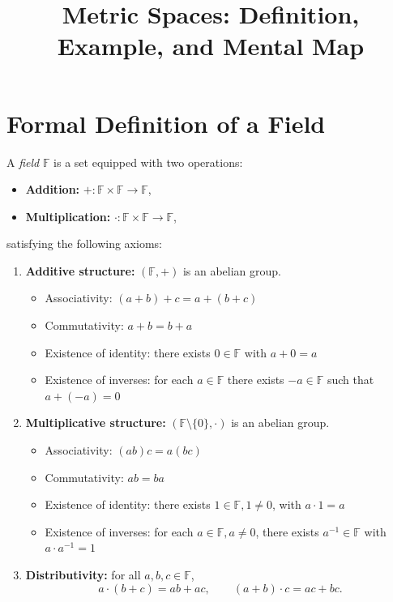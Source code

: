 \documentclass[11pt,a4paper]{article}
\title{Metric Spaces: Definition, Example, and Mental Map}
\author{}
\date{}
\theoremstyle{definition}
\theoremstyle{remark}
\begin{document}
	
	\maketitle
	\section*{Formal Definition of a Field}
	
	A \emph{field} $\mathbb{F}$ is a set equipped with two operations:
	\begin{itemize}
		\item \textbf{Addition:} $+: \mathbb{F} \times \mathbb{F} \to \mathbb{F}$,
		\item \textbf{Multiplication:} $\cdot: \mathbb{F} \times \mathbb{F} \to \mathbb{F}$,
	\end{itemize}
	satisfying the following axioms:
	
	\begin{enumerate}
		\item \textbf{Additive structure:} $(\mathbb{F},+)$ is an abelian group.
		\begin{itemize}
			\item Associativity: $(a+b)+c = a+(b+c)$
			\item Commutativity: $a+b = b+a$
			\item Existence of identity: there exists $0 \in \mathbb{F}$ with $a+0=a$
			\item Existence of inverses: for each $a \in \mathbb{F}$ there exists $-a \in \mathbb{F}$ such that $a+(-a)=0$
		\end{itemize}
		
		\item \textbf{Multiplicative structure:} $(\mathbb{F}\setminus\{0\},\cdot)$ is an abelian group.
		\begin{itemize}
			\item Associativity: $(ab)c = a(bc)$
			\item Commutativity: $ab = ba$
			\item Existence of identity: there exists $1 \in \mathbb{F}, 1\neq 0$, with $a\cdot 1=a$
			\item Existence of inverses: for each $a \in \mathbb{F}, a\neq 0$, there exists $a^{-1} \in \mathbb{F}$ with $a\cdot a^{-1}=1$
		\end{itemize}
		
		\item \textbf{Distributivity:} for all $a,b,c \in \mathbb{F}$,
		$$
		a\cdot(b+c) = ab + ac, \qquad (a+b)\cdot c = ac + bc.
		$$
	\end{enumerate}
	
\end{document}
